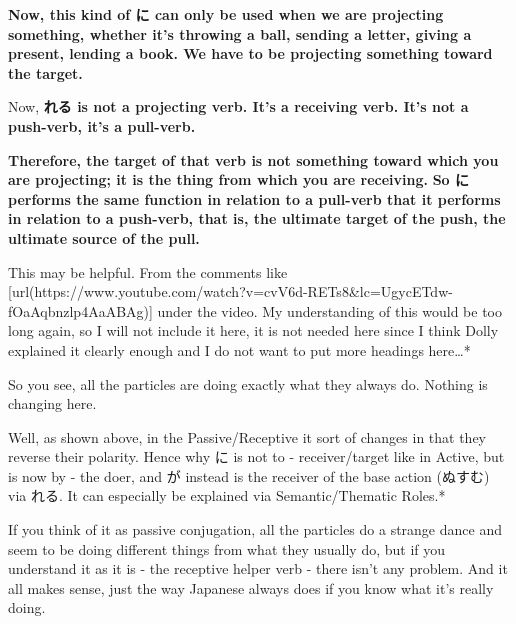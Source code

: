{}

{\bf Now, this kind of に can only be used when we are projecting something, whether it's throwing a ball, sending a letter, giving a present, lending a book. We have to be projecting something toward the target.}

\thinrule

Now, {\bf れる is not a projecting verb. It's a receiving verb. It's not a push-verb, it's a pull-verb.}

{}

{\bf Therefore, the target of that verb is not something toward which you are projecting; it is the thing from which you are receiving.} {\bf So に performs the same function in relation to a pull-verb that it performs in relation to a push-verb, that is, the ultimate target of the push, the ultimate source of the pull.}

This may be helpful. From the comments like [url(https://www.youtube.com/watch?v=cvV6d-RETs8&lc=UgycETdw-fOaAqbnzlp4AaABAg)] under the video.\crlf
My understanding of this would be too long again, so I will not include it here, it is not needed here since I think Dolly explained it clearly enough and I do not want to put more headings here\ldots{}*

{}

{}

So you see, all the particles are doing exactly what they always do. Nothing is changing here.

Well, as shown above, in the Passive/Receptive it sort of changes in that they reverse their polarity. Hence why に is not to - receiver/target like in Active, but is now by - the doer, and が instead is the receiver of the base action (ぬすむ) via れる. It can especially be explained via Semantic/Thematic Roles.*

If you think of it as passive conjugation, all the particles do a strange dance and seem to be doing different things from what they usually do, but if you understand it as it is - the receptive helper verb - there isn't any problem. And it all makes sense, just the way Japanese always does if you know what it's really doing.

\stopsectionlevel

\startsectionlevel[title={Nuisance Receptive/Passive/迷惑受け身},reference={nuisance-receptivepassive迷惑受け身}]

